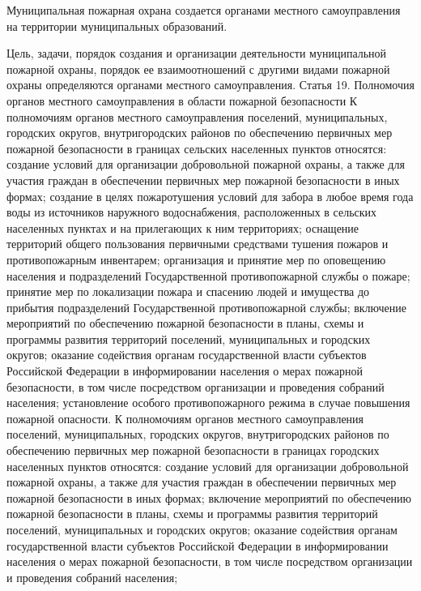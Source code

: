 \documentclass[a4paper, 12pt]{article}
\theoremstyle{definition}
\begin{document}
        Муниципальная пожарная охрана создается органами местного самоуправления на территории муниципальных образований.

        Цель, задачи, порядок создания и организации деятельности муниципальной пожарной охраны, порядок ее взаимоотношений с другими видами пожарной охраны определяются органами местного самоуправления.
        Статья 19. Полномочия органов местного самоуправления в области пожарной безопасности
        К полномочиям органов местного самоуправления поселений, муниципальных, городских округов, внутригородских районов по обеспечению первичных мер пожарной безопасности в границах сельских населенных пунктов относятся:
        создание условий для организации добровольной пожарной охраны, а также для участия граждан в обеспечении первичных мер пожарной безопасности в иных формах;
        создание в целях пожаротушения условий для забора в любое время года воды из источников наружного водоснабжения, расположенных в сельских населенных пунктах и на прилегающих к ним территориях;
        оснащение территорий общего пользования первичными средствами тушения пожаров и противопожарным инвентарем;
        организация и принятие мер по оповещению населения и подразделений Государственной противопожарной службы о пожаре;
        принятие мер по локализации пожара и спасению людей и имущества до прибытия подразделений Государственной противопожарной службы;
        включение мероприятий по обеспечению пожарной безопасности в планы, схемы и программы развития территорий поселений, муниципальных и городских округов;
        оказание содействия органам государственной власти субъектов Российской Федерации в информировании населения о мерах пожарной безопасности, в том числе посредством организации и проведения собраний населения;
        установление особого противопожарного режима в случае повышения пожарной опасности.
        К полномочиям органов местного самоуправления поселений, муниципальных, городских округов, внутригородских районов по обеспечению первичных мер пожарной безопасности в границах городских населенных пунктов относятся:
        создание условий для организации добровольной пожарной охраны, а также для участия граждан в обеспечении первичных мер пожарной безопасности в иных формах;
        включение мероприятий по обеспечению пожарной безопасности в планы, схемы и программы развития территорий поселений, муниципальных и городских округов;
        оказание содействия органам государственной власти субъектов Российской Федерации в информировании населения о мерах пожарной безопасности, в том числе посредством организации и проведения собраний населения;
\end{document}
